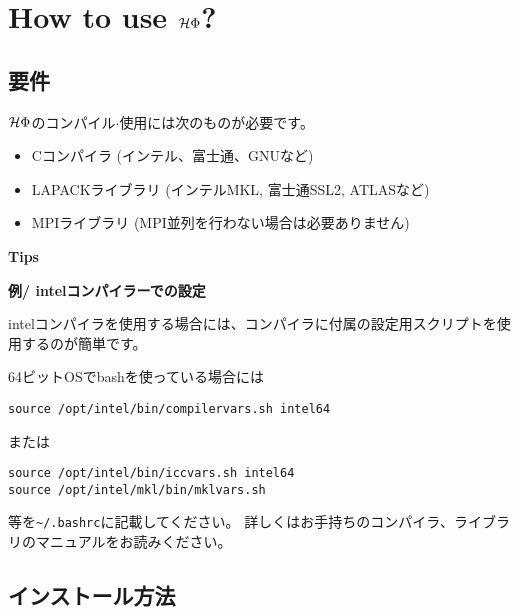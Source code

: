 \chapter{How to use $\mathcal{H} \Phi$?}
\label{Ch:HowTo}

\section{要件}

$\mathcal{H} \Phi$のコンパイル$\cdot$使用には次のものが必要です。
\begin{itemize}
\item Cコンパイラ (インテル、富士通、GNUなど)
\item LAPACKライブラリ (インテルMKL, 富士通SSL2, ATLASなど)
\item MPIライブラリ (MPI並列を行わない場合は必要ありません)
\end{itemize}

\begin{screen}
\Large 
{\bf Tips}
\normalsize

{\bf 例/ intelコンパイラーでの設定}

intelコンパイラを使用する場合には、コンパイラに付属の設定用スクリプトを使用するのが簡単です。

64ビットOSでbashを使っている場合には
\begin{verbatim}
source /opt/intel/bin/compilervars.sh intel64
\end{verbatim}
または
\begin{verbatim}
source /opt/intel/bin/iccvars.sh intel64
source /opt/intel/mkl/bin/mklvars.sh
\end{verbatim}
等を\verb|~/.bashrc|に記載してください。
詳しくはお手持ちのコンパイラ、ライブラリのマニュアルをお読みください。

\end{screen}


\section{インストール方法}

\label{Sec:HowToInstall}
